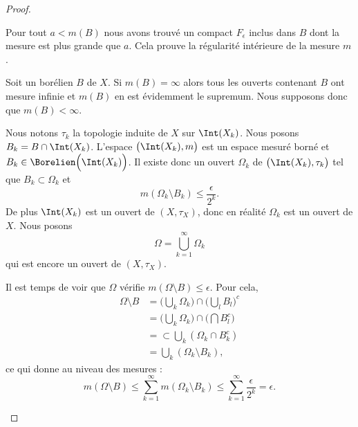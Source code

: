 \begin{proof}
\begin{subproof}
		Pour tout \( a<m(B)\) nous avons trouvé un compact \( F_{\epsilon}\) inclus dans \( B\) dont la mesure est plus grande que \( a\). Cela prouve la régularité intérieure de la mesure \( m\).


		Soit un borélien \( B\) de \( X\). Si \( m(B)=\infty\) alors tous les ouverts contenant \( B\) ont mesure infinie et \( m(B)\) en est évidemment le supremum. Nous supposons donc que \( m(B)<\infty\).

		Nous notons \( \tau_k\) la topologie induite de \( X\) sur \( \Int(X_k)\). Nous posons \( B_k=B\cap\Int(X_k)\). L'espace \( \big( \Int(X_k),m \big)\) est un espace mesuré borné et \( B_k\in \Borelien\Big( \Int(X_k) \Big)\). Il existe donc un ouvert \( \Omega_k\) de \( \big( \Int(X_k),\tau_k \big)\) tel que \( B_k\subset \Omega_k\) et
		\begin{equation}
			m(\Omega_k\setminus B_k)\leq \frac{ \epsilon }{ 2^k }.
		\end{equation}
		De plus \( \Int(X_k)\) est un ouvert de \( (X,\tau_X)\), donc en réalité \( \Omega_k\) est un ouvert de \( X\). Nous posons
		\begin{equation}
			\Omega=\bigcup_{k=1}^{\infty}\Omega_k
		\end{equation}
		qui est encore un ouvert de \( (X,\tau_X)\).

		Il est temps de voir que \( \Omega\) vérifie \( m(\Omega\setminus B)\leq \epsilon\). Pour cela,
		\begin{subequations}
			\begin{align}
				\Omega\setminus B & =\big( \bigcup_k\Omega_k \big)\cap\big( \bigcup_lB_l \big)^c \\
				                  & =\big( \bigcup_k\Omega_k \big)\cap\big( \bigcap B_l^c \big)  \\
				                  & =\subset\bigcup_k(\Omega_k\cap B_k^c)                        \\
				                  & =\bigcup_k(\Omega_k\setminus B_k),
			\end{align}
		\end{subequations}
		ce qui donne au niveau des mesures :
		\begin{equation}
			m(\Omega\setminus B)\leq\sum_{k=1}^{\infty}m(\Omega_k\setminus B_k)\leq\sum_{k=1}^{\infty}\frac{ \epsilon }{ 2^k }=\epsilon.
		\end{equation}
	\end{subproof}
\end{proof}

